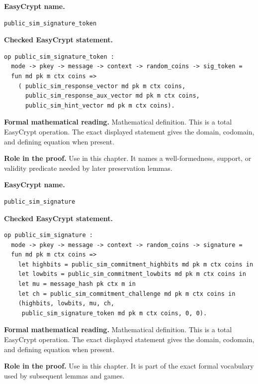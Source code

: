 \begin{formaldefinition}
\noindent\textbf{EasyCrypt name.}
\begin{lstlisting}[language=EasyCrypt,basicstyle=\ttfamily\scriptsize]
public_sim_signature_token
\end{lstlisting}
\noindent\textbf{Checked EasyCrypt statement.}
\begin{lstlisting}[language=EasyCrypt,basicstyle=\ttfamily\scriptsize]
op public_sim_signature_token :
  mode -> pkey -> message -> context -> random_coins -> sig_token =
  fun md pk m ctx coins =>
    ( public_sim_response_vector md pk m ctx coins,
      public_sim_response_aux_vector md pk m ctx coins,
      public_sim_hint_vector md pk m ctx coins).
\end{lstlisting}
\noindent\textbf{Formal mathematical reading.}
Mathematical definition. This is a total EasyCrypt operation.  The exact displayed statement gives the domain, codomain, and defining equation when present.

\noindent\textbf{Role in the proof.}
Use in this chapter. It names a well-formedness, support, or validity predicate needed by later preservation lemmas.

\end{formaldefinition}

\begin{formaldefinition}
\noindent\textbf{EasyCrypt name.}
\begin{lstlisting}[language=EasyCrypt,basicstyle=\ttfamily\scriptsize]
public_sim_signature
\end{lstlisting}
\noindent\textbf{Checked EasyCrypt statement.}
\begin{lstlisting}[language=EasyCrypt,basicstyle=\ttfamily\scriptsize]
op public_sim_signature :
  mode -> pkey -> message -> context -> random_coins -> signature =
  fun md pk m ctx coins =>
    let highbits = public_sim_commitment_highbits md pk m ctx coins in
    let lowbits = public_sim_commitment_lowbits md pk m ctx coins in
    let mu = message_hash pk ctx m in
    let ch = public_sim_commitment_challenge md pk m ctx coins in
    (highbits, lowbits, mu, ch,
     public_sim_signature_token md pk m ctx coins, 0, 0).
\end{lstlisting}
\noindent\textbf{Formal mathematical reading.}
Mathematical definition. This is a total EasyCrypt operation.  The exact displayed statement gives the domain, codomain, and defining equation when present.

\noindent\textbf{Role in the proof.}
Use in this chapter. It is part of the exact formal vocabulary used by subsequent lemmas and games.

\end{formaldefinition}

